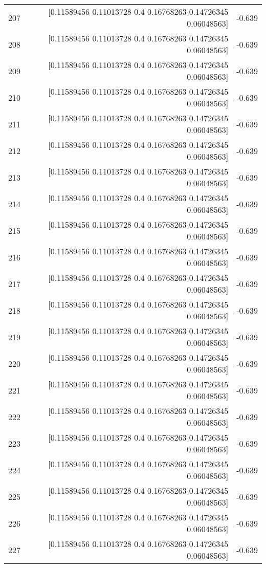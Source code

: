 \begin{longtable}{lrr}
207 & [0.11589456 0.11013728 0.4        0.16768263 0.14726345 0.06048563] & -0.639 \\
208 & [0.11589456 0.11013728 0.4        0.16768263 0.14726345 0.06048563] & -0.639 \\
209 & [0.11589456 0.11013728 0.4        0.16768263 0.14726345 0.06048563] & -0.639 \\
210 & [0.11589456 0.11013728 0.4        0.16768263 0.14726345 0.06048563] & -0.639 \\
211 & [0.11589456 0.11013728 0.4        0.16768263 0.14726345 0.06048563] & -0.639 \\
212 & [0.11589456 0.11013728 0.4        0.16768263 0.14726345 0.06048563] & -0.639 \\
213 & [0.11589456 0.11013728 0.4        0.16768263 0.14726345 0.06048563] & -0.639 \\
214 & [0.11589456 0.11013728 0.4        0.16768263 0.14726345 0.06048563] & -0.639 \\
215 & [0.11589456 0.11013728 0.4        0.16768263 0.14726345 0.06048563] & -0.639 \\
216 & [0.11589456 0.11013728 0.4        0.16768263 0.14726345 0.06048563] & -0.639 \\
217 & [0.11589456 0.11013728 0.4        0.16768263 0.14726345 0.06048563] & -0.639 \\
218 & [0.11589456 0.11013728 0.4        0.16768263 0.14726345 0.06048563] & -0.639 \\
219 & [0.11589456 0.11013728 0.4        0.16768263 0.14726345 0.06048563] & -0.639 \\
220 & [0.11589456 0.11013728 0.4        0.16768263 0.14726345 0.06048563] & -0.639 \\
221 & [0.11589456 0.11013728 0.4        0.16768263 0.14726345 0.06048563] & -0.639 \\
222 & [0.11589456 0.11013728 0.4        0.16768263 0.14726345 0.06048563] & -0.639 \\
223 & [0.11589456 0.11013728 0.4        0.16768263 0.14726345 0.06048563] & -0.639 \\
224 & [0.11589456 0.11013728 0.4        0.16768263 0.14726345 0.06048563] & -0.639 \\
225 & [0.11589456 0.11013728 0.4        0.16768263 0.14726345 0.06048563] & -0.639 \\
226 & [0.11589456 0.11013728 0.4        0.16768263 0.14726345 0.06048563] & -0.639 \\
227 & [0.11589456 0.11013728 0.4        0.16768263 0.14726345 0.06048563] & -0.639 \\

\end{longtable}
